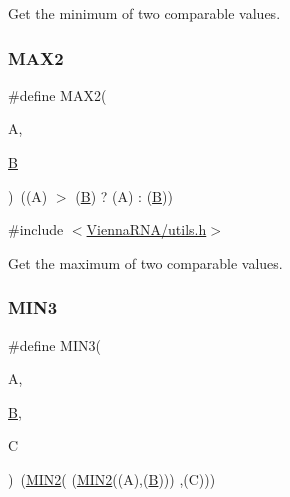 Get the minimum of two comparable values. 

\mbox{\label{group__utils_ga33297b3679c713b0c4d897cd0fe3b122}} 
\subsubsection{\texorpdfstring{M\+A\+X2}{MAX2}}
{\footnotesize\ttfamily \#define M\+A\+X2(\begin{DoxyParamCaption}\item[{}]{A,  }\item[{}]{\mbox{\hyperlink{group__energy__parameters__rw_gga7bf2bb363bcf5ce50d60255d256e5682a3f2a77ecd272aa6d6b5902faa5e5fc68}{B}} }\end{DoxyParamCaption})~((A) $>$ (\mbox{\hyperlink{group__energy__parameters__rw_gga7bf2bb363bcf5ce50d60255d256e5682a3f2a77ecd272aa6d6b5902faa5e5fc68}{B}}) ? (A) \+: (\mbox{\hyperlink{group__energy__parameters__rw_gga7bf2bb363bcf5ce50d60255d256e5682a3f2a77ecd272aa6d6b5902faa5e5fc68}{B}}))}



{\ttfamily \#include $<$\mbox{\hyperlink{utils_8h}{Vienna\+R\+N\+A/utils.\+h}}$>$}



Get the maximum of two comparable values. 

\mbox{\label{group__utils_ga721b8d5f3abef17f10293f1f7f8c958e}} 
\subsubsection{\texorpdfstring{M\+I\+N3}{MIN3}}
{\footnotesize\ttfamily \#define M\+I\+N3(\begin{DoxyParamCaption}\item[{}]{A,  }\item[{}]{\mbox{\hyperlink{group__energy__parameters__rw_gga7bf2bb363bcf5ce50d60255d256e5682a3f2a77ecd272aa6d6b5902faa5e5fc68}{B}},  }\item[{}]{C }\end{DoxyParamCaption})~(\mbox{\hyperlink{group__utils_gae0b9cd0ce090bd69b951aa73e8fa4f7d}{M\+I\+N2}}(  (\mbox{\hyperlink{group__utils_gae0b9cd0ce090bd69b951aa73e8fa4f7d}{M\+I\+N2}}((A),(\mbox{\hyperlink{group__energy__parameters__rw_gga7bf2bb363bcf5ce50d60255d256e5682a3f2a77ecd272aa6d6b5902faa5e5fc68}{B}}))) ,(C)))}



